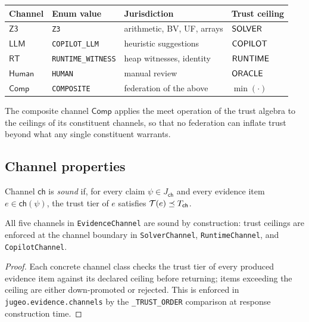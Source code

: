 \documentclass[11pt]{article}
\newcommand{\ECZ}{\mathsf{Z3}}
\newcommand{\ECLlm}{\mathsf{LLM}}
\newcommand{\ECRt}{\mathsf{RT}}
\newcommand{\ECHuman}{\mathsf{Human}}
\newcommand{\ECComp}{\mathsf{Comp}}
\newcommand{\VC}{\psi}                    %
\begin{document}
\begin{center}
\begin{tabular}{@{}llll@{}}
\toprule
Channel & Enum value & Jurisdiction & Trust ceiling \\
\midrule
$\ECZ$      & \texttt{Z3}               & arithmetic, BV, UF, arrays & $\mathsf{SOLVER}$ \\
$\ECLlm$    & \texttt{COPILOT\_LLM}     & heuristic suggestions       & $\mathsf{COPILOT}$ \\
$\ECRt$     & \texttt{RUNTIME\_WITNESS} & heap witnesses, identity    & $\mathsf{RUNTIME}$ \\
$\ECHuman$  & \texttt{HUMAN}            & manual review               & $\mathsf{ORACLE}$ \\
$\ECComp$   & \texttt{COMPOSITE}        & federation of the above     & $\min(\cdot)$ \\
\bottomrule
\end{tabular}
\end{center}

The composite channel $\ECComp$ applies the meet operation of the trust
algebra to the ceilings of its constituent channels, so that no
federation can inflate trust beyond what any single constituent
warrants.

\subsection{Channel properties}\label{sec:channel-properties}

\begin{definition}\label{def:channel-soundness}
Channel $\mathsf{ch}$ is \emph{sound} if, for every claim
$\VC \in J_{\mathsf{ch}}$ and every evidence item
$e \in \mathsf{ch}(\VC)$, the trust tier of $e$ satisfies
$\mathcal{T}(e) \preceq T_{\mathsf{ch}}$.
\end{definition}

\begin{proposition}\label{prop:channel-sound}
All five channels in \texttt{EvidenceChannel} are sound by construction:
trust ceilings are enforced at the channel boundary in
\texttt{SolverChannel}, \texttt{RuntimeChannel}, and
\texttt{CopilotChannel}.
\end{proposition}

\begin{proof}
Each concrete channel class checks the trust tier of every produced
evidence item against its declared ceiling before returning; items
exceeding the ceiling are either down-promoted or rejected.  This is
enforced in \texttt{jugeo.evidence.channels} by the \texttt{\_TRUST\_ORDER}
comparison at response construction time.
\end{proof}
\end{document}
